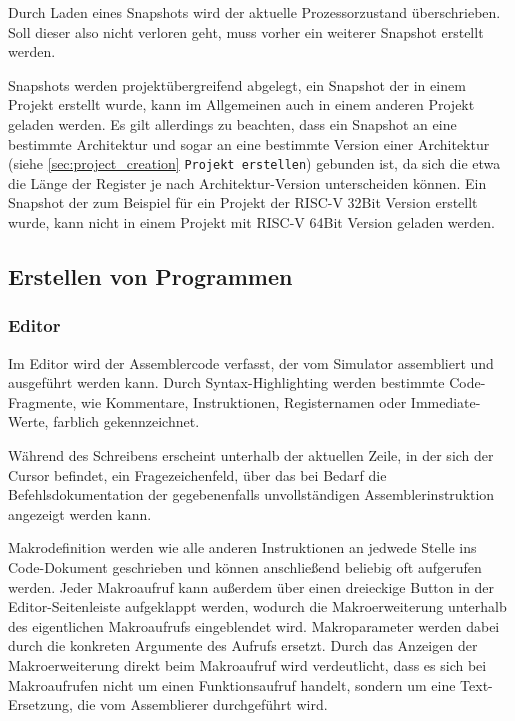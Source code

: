 \begin{warningblock}
Durch Laden eines Snapshots wird der aktuelle Prozessorzustand überschrieben.
Soll dieser also nicht verloren geht, muss vorher ein weiterer Snapshot erstellt
werden.
\end{warningblock}

Snapshots werden projektübergreifend abgelegt, ein Snapshot der in einem Projekt
erstellt wurde, kann im Allgemeinen auch in einem anderen Projekt geladen
werden. Es gilt allerdings zu beachten, dass ein Snapshot an eine bestimmte
Architektur und sogar an eine bestimmte Version einer Architektur (siehe
\ref{sec:project_creation} \texttt{Projekt erstellen}) gebunden ist, da sich die etwa
die Länge der Register je nach Architektur-Version unterscheiden können. Ein
Snapshot der zum Beispiel für ein Projekt der RISC-V 32Bit Version erstellt
wurde, kann nicht in einem Projekt mit RISC-V 64Bit Version geladen werden.

\subsection{Erstellen von Programmen}

\subsubsection{Editor}
\label{sec:Editor}

Im Editor wird der Assemblercode verfasst, der vom Simulator assembliert und
ausgeführt werden kann. Durch Syntax-Highlighting werden bestimmte
Code-Fragmente, wie Kommentare, Instruktionen, Registernamen oder Immediate-Werte,
farblich gekennzeichnet.

Während des Schreibens erscheint unterhalb der aktuellen Zeile, in der sich der
Cursor befindet, ein Fragezeichenfeld, über das bei Bedarf die
Befehlsdokumentation der gegebenenfalls unvollständigen Assemblerinstruktion
angezeigt werden kann.

Makrodefinition werden wie alle anderen Instruktionen an jedwede Stelle ins
Code-Dokument geschrieben und können anschließend beliebig oft aufgerufen
werden. Jeder Makroaufruf kann außerdem über einen dreieckige Button in
der Editor-Seitenleiste aufgeklappt werden, wodurch die Makroerweiterung
unterhalb des eigentlichen Makroaufrufs eingeblendet wird. Makroparameter werden
dabei durch die konkreten Argumente des Aufrufs ersetzt. Durch das Anzeigen der
Makroerweiterung direkt beim Makroaufruf wird verdeutlicht, dass es sich bei
Makroaufrufen nicht um einen Funktionsaufruf handelt, sondern um eine
Text-Ersetzung, die vom Assemblierer durchgeführt wird.

